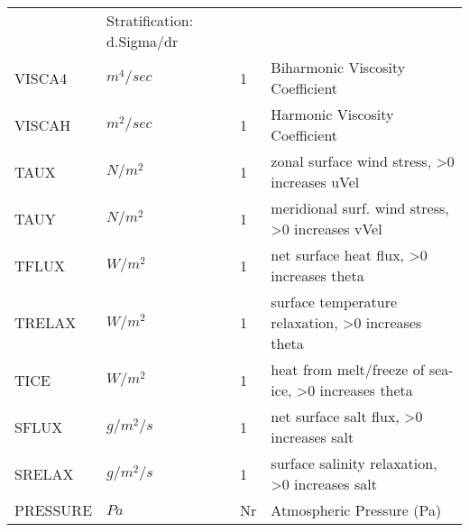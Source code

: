 \begin{table}
\begin{tabular}{llll}
         &\begin{minipage}[t]{3in}
          {Stratification: d.Sigma/dr} 
         \end{minipage}\\
 VISCA4   & $m^4/sec$ & 1
         &\begin{minipage}[t]{3in}
          {Biharmonic Viscosity Coefficient} 
         \end{minipage}\\
 VISCAH   & $m^2/sec$ & 1
         &\begin{minipage}[t]{3in}
          {Harmonic Viscosity Coefficient} 
         \end{minipage}\\
 TAUX     & $N/m^2        $ & 1 
         &\begin{minipage}[t]{3in}
          {zonal surface wind stress, >0 increases uVel}
         \end{minipage}\\
 TAUY     & $N/m^2        $ & 1 
         &\begin{minipage}[t]{3in}
          {meridional surf. wind stress, >0 increases vVel}
         \end{minipage}\\
 TFLUX    & $W/m^2        $ & 1 
         &\begin{minipage}[t]{3in}
          {net surface heat flux, >0 increases theta}
         \end{minipage}\\
 TRELAX   & $W/m^2        $ & 1 
         &\begin{minipage}[t]{3in}
          {surface temperature relaxation, >0 increases theta}
         \end{minipage}\\
 TICE     & $W/m^2        $ & 1 
         &\begin{minipage}[t]{3in}
          {heat from melt/freeze of sea-ice, >0 increases theta}
         \end{minipage}\\
 SFLUX    & $g/m^2/s      $ & 1 
         &\begin{minipage}[t]{3in}
          {net surface salt flux, >0 increases salt}
         \end{minipage}\\
 SRELAX   & $g/m^2/s      $ & 1 
         &\begin{minipage}[t]{3in}
          {surface salinity relaxation, >0 increases salt}
         \end{minipage}\\
 PRESSURE & $Pa           $ & Nr 
         &\begin{minipage}[t]{3in}
          {Atmospheric Pressure (Pa)}
         \end{minipage}\\
\end{tabular}
\end{table}
\vspace{1.5in}
\vfill

